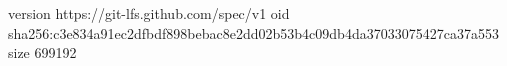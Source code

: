 version https://git-lfs.github.com/spec/v1
oid sha256:c3e834a91ec2dfbdf898bebac8e2dd02b53b4c09db4da37033075427ca37a553
size 699192
